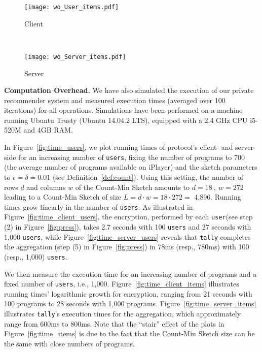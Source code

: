 \documentclass[conference]{IEEEtran}
\newcommand{\descr}[1]{\medskip \noindent \textbf{#1}}
\newcommand{\user}{{\tt user}\xspace}
\newcommand{\users}{{\tt users}\xspace}
\newcommand{\tally}{{\tt tally}\xspace}
\begin{document}
\begin{figure*}[t]
\centering
    \begin{subfigure}[t]{0.4\textwidth}
        \centering
		\texttt{[image: wo\_User\_items.pdf]}
        \caption{\label{fig:wo_time_client_items} Client}
    \end{subfigure} 
~
    \begin{subfigure}[t]{0.4\textwidth}
        \centering
		\texttt{[image: wo\_Server\_items.pdf]}
        \caption{\label{fig:wo_time_server_items} Server}
    \end{subfigure}\vspace{-0.3cm}
\caption{\label{fig:wo_time_items} Execution time  for increasing number of programs (with 1,000 \users)  {\em without} Count-Min Sketch.}
\vspace{-0.2cm}
\end{figure*}


\descr{Computation Overhead.} 
We have also simulated the execution of our private recommender system and measured execution times (averaged over 100 iterations) for all operations. 
Simulations have been performed on a machine running Ubuntu Trusty (Ubuntu 14.04.2 LTS), equipped with a 2.4 GHz CPU i5-520M and 4GB RAM. 

In Figure~\ref{fig:time_users}, we plot running times of protocol's client- and server-side for an increasing number of \users, fixing the number of programs to 700 (the average number of programs available on iPlayer) and the sketch parameters to $\epsilon = \delta = 0.01$ (see Definition~\ref{def:count}). 
Using this setting, the number of rows $d$ and columns $w$ of the Count-Min Sketch amounts to  
$
d=18 \:, \:w= 272
$ 
leading to a Count-Min Sketch of size $L = d \cdot w = 18 \cdot 272 =$ 4,896. 
Running times grow linearly in the number of \users. 
As illustrated in Figure~\ref{fig:time_client_users}, the encryption, performed by each \user (see step (2) in Figure~\ref{fig:press}), takes 2.7 seconds with 100 \users and 27 seconds with 1,000 \users, while
Figure~\ref{fig:time_server_users} reveals that \tally completes the aggregation (step (5) in Figure~\ref{fig:press}) in 78ms (resp., 780ms) with 100  (resp., 1,000) \users.




We then measure the execution time for an increasing number of programs and a fixed number of \users, i.e., 1,000.
Figure~\ref{fig:time_client_items} illustrates running times' logarithmic growth for encryption, ranging from 21 seconds with 100 programs to 28 seconds with 1,000 programs. Figure~\ref{fig:time_server_items} illustrates \tally's execution times for the aggregation, which approximately range from 600ms to 800ms.
Note that the ``stair'' effect of the plots in Figure~\ref{fig:time_items} is due to the fact that the Count-Min Sketch size can be the same with close numbers of programs.
\end{document}
